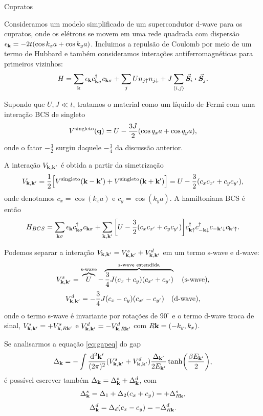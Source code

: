 \documentclass[a4paper,10pt]{article}
\begin{document}
\begin{section}{Cupratos}

Consideramos um modelo simplificado de um supercondutor d-wave para os cupratos, onde os elétrons se movem em uma rede quadrada com dispersão $\epsilon_{\vb{k}} = -2t (\cos k_x a + \cos k_y a)$. Incluimos a repulsão de Coulomb por meio de um termo de Hubbard e também consideramos interações antiferromagnéticas para primeiros vizinhos:
$$
H = \sum_{\k} \eps_{\k} c_{\k\s}^\d c_{\k\s} + \sum_{j} U n_{j\up} n_{j\down} + J \sum_{\nn{i}{j}} \va*{S}_i \vdot \va*{S}_j.
$$

Supondo que $U, J \ll t$, tratamos o material como um líquido de Fermi com uma interação BCS de singleto
$$
V^{\text{singleto}}(\vb{q}) = U - \frac{3J}{2} (\cos q_x a + \cos q_y a),
$$
onde o fator $-\frac{3}{2}$ surgiu daquele $-\frac{3}{4}$ da discussão anterior.

A interação $V_{\vb{k},\vb{k}'}$ é obtida a partir da simetrização
$$
V_{\vb{k},\vb{k}'} = \frac{1}{2}
\Big[
V^{\text{singleto}}(\vb{k}-\vb{k}') + V^{\text{singleto}}(\vb{k}+\vb{k}')
\Big] =
U - \frac{3}{2} (c_x c_{x'} + c_y c_{y'}),
$$
onde denotamos $c_x = \cos(k_x a)$ e $c_y = \cos(k_y a)$. A hamiltoniana BCS é então
$$
H_{BCS} = \sum_{\vb{k}\sigma} \epsilon_{\vb{k}} c_{\vb{k}\sigma}^\dagger c_{\vb{k}\sigma} +
\sum_{\vb{k},\vb{k}'} \qty[U - \frac{3}{2} (c_x c_{x'} + c_y c_{y'})]
c_{\vb{k}\uparrow}^\dagger c_{-\vb{k}\downarrow}^\dagger c_{-\vb{k}'\downarrow} c_{\vb{k}'\uparrow}.
$$


Podemos separar a interação $V_{\vb{k},\vb{k}'} = V_{\vb{k},\vb{k}'}^s + V_{\vb{k},\vb{k}'}^d$ em um termo s-wave e d-wave:
$$
V_{\vb{k},\vb{k}'}^s =
\overbrace{U}^{\text{s-wave}} -
\overbrace{\frac{3}{4} J (c_x + c_y) (c_{x'} + c_{y'})}^{\text{s-wave estendida}}
\quad \text{(s-wave)},
$$
$$
V_{\vb{k},\vb{k}'}^d = - \frac{3}{4} J (c_x - c_y) (c_{x'} - c_{y'})
\quad \text{(d-wave)},
$$
onde o termo s-wave é invariante por rotações de $90^\circ$ e o termo d-wave troca de sinal, $V_{\vb{k},\vb{k}'}^s = + V_{\vb{k}, R\vb{k}'}^s$ e $V_{\vb{k},\vb{k}'}^d = - V_{\vb{k}, R\vb{k}'}^d$ com $R\vb{k} = (-k_y, k_x)$.

\n

Se analisarmos a equação \ref{eq:gapeq} do gap
$$
\Delta_{\vb{k}} = - \int \frac{\dd[2]{\vb{k}'}}{(2\pi)^2} (V_{\vb{k},\vb{k}'}^s + V_{\vb{k},\vb{k}'}^d) \frac{\Delta_{\vb{k}'}}{2 E_{\vb{k}'}} \tanh(\frac{\beta E_{\vb{k}'}}{2}),
$$
é possível escrever também $\Delta_{\vb{k}} = \Delta_{\vb{k}}^s + \Delta_{\vb{k}}^d$, com
$$
\Delta_{\vb{k}}^s = \Delta_1 + \Delta_ 2 (c_x + c_y) = + \Delta_{R\vb{k}}^s,
$$
$$
\Delta_{\vb{k}}^d = \Delta_d (c_x - c_y) = - \Delta_{R\vb{k}}^d.
$$


\end{section}
\end{document}
